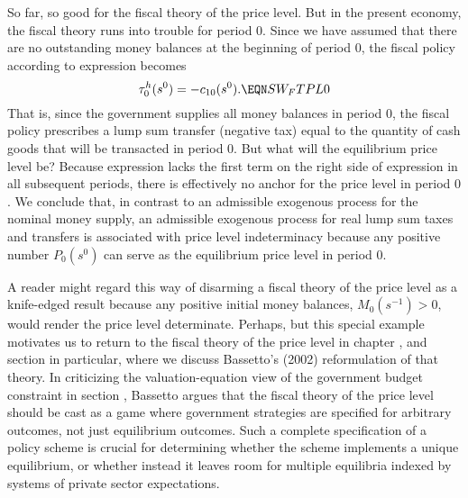 So far, so good for the fiscal theory of the price level. But in the present economy, the fiscal theory
runs into trouble for  period $0$. Since we have
assumed that there are no outstanding money balances at the
beginning of period $0$, the fiscal policy according
to expression  becomes
$$
\tau_0^h(s^0) = - c_{10}(s^0).                      \EQN SW_FTPL0
$$
That is, since the government supplies all  money balances
in period $0$, the fiscal policy prescribes
a lump sum transfer (negative tax) equal to the quantity of cash
goods that will be transacted in period $0$. But what will  the
equilibrium price level be? Because expression  lacks
the first term on the right side of expression  in
all subsequent periods, there is effectively no anchor for the price
level in period $0$. We conclude that, in contrast to an admissible
exogenous process for the nominal money supply, an admissible
exogenous process for real lump sum taxes and transfers is
associated with price level indeterminacy because any positive
number $P_0(s^0)$ can serve as the equilibrium price level in
period $0$.


A reader might regard this way of disarming a fiscal theory
of the price level as  a knife-edged result because any positive
initial money balances, $M_0(s^{-1})>0$, would render the price level
determinate. Perhaps, but this special example motivates us
to return to the fiscal theory of the price level in
chapter , and section 
in particular, where we discuss Bassetto's (2002)
 reformulation of that theory.
In criticizing the valuation-equation view of the government
budget constraint in section ,
Bassetto argues that the fiscal theory of the price level should
be cast as a game where government strategies are specified for
arbitrary outcomes, not just equilibrium outcomes. Such a complete specification of a policy scheme
is crucial for determining whether the scheme implements a unique
equilibrium, or whether instead  it leaves room for multiple equilibria indexed by systems of
private sector expectations.

